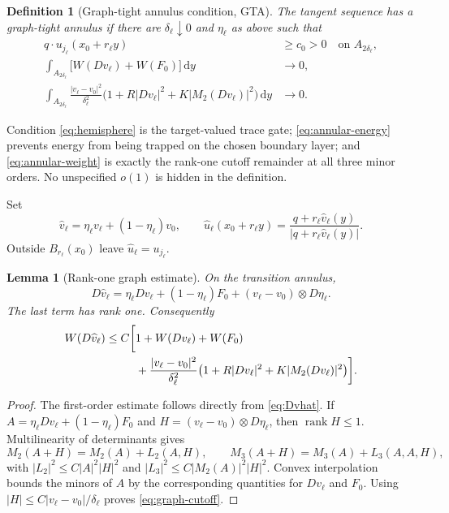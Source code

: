 \documentclass[10pt]{article}
\newtheorem{lemma}[theorem]{Lemma}
\newtheorem{definition}[theorem]{Definition}
\newcommand{\dd}{\,\mathrm d}
\begin{document}
\begin{definition}[Graph-tight annulus condition, GTA]
The tangent sequence has a graph-tight annulus if there are
$\delta_\ell\downarrow0$ and $\eta_\ell$ as above such that
\begin{align}
 q\cdot u_{j_\ell}(x_0+r_\ell y)&\geq c_0>0
 \quad\text{on }A_{2\delta_\ell},                        \label{eq:hemisphere}\\
 \int_{A_{2\delta_\ell}}\!\!
 \bigl[W(Dv_\ell)+W(F_0)\bigr]\dd y&\longrightarrow0,    \label{eq:annular-energy}\\
 \int_{A_{2\delta_\ell}}\!\!
 \frac{|v_\ell-v_0|^2}{\delta_\ell^2}
 \bigl(1+R|Dv_\ell|^2+K|M_2(Dv_\ell)|^2\bigr)\dd y
 &\longrightarrow0.                                    \label{eq:annular-weight}
\end{align}
\end{definition}

Condition \eqref{eq:hemisphere} is the target-valued trace gate;
\eqref{eq:annular-energy} prevents energy from being trapped on the chosen
boundary layer; and \eqref{eq:annular-weight} is exactly the rank-one cutoff
remainder at all three minor orders.  No unspecified $o(1)$ is hidden in the
definition.

Set
\begin{equation}
 \widehat v_\ell
 =\eta_\ell v_\ell+(1-\eta_\ell)v_0,\qquad
 \widehat u_\ell(x_0+r_\ell y)
 =\frac{q+r_\ell\widehat v_\ell(y)}
 {|q+r_\ell\widehat v_\ell(y)|}.                        \label{eq:uhat}
\end{equation}
Outside $B_{r_\ell}(x_0)$ leave $\widehat u_\ell=u_{j_\ell}$.

\begin{lemma}[Rank-one graph estimate]
On the transition annulus,
\begin{equation}
 D\widehat v_\ell
 =\eta_\ell Dv_\ell+(1-\eta_\ell)F_0
 +(v_\ell-v_0)\otimes D\eta_\ell.                       \label{eq:Dvhat}
\end{equation}
The last term has rank one.  Consequently
\begin{align}
 W(D\widehat v_\ell)
 \leq C\bigg[&
 1+W(Dv_\ell)+W(F_0)\notag\\
 &+\frac{|v_\ell-v_0|^2}{\delta_\ell^2}
 \bigl(1+R|Dv_\ell|^2+K|M_2(Dv_\ell)|^2\bigr)\bigg].
 \label{eq:graph-cutoff}
\end{align}
\end{lemma}

\begin{proof}
The first-order estimate follows directly from \eqref{eq:Dvhat}.  If
$A=\eta_\ell Dv_\ell+(1-\eta_\ell)F_0$ and
$H=(v_\ell-v_0)\otimes D\eta_\ell$, then $\operatorname{rank}H\leq1$.
Multilinearity of determinants gives
\[
 M_2(A+H)=M_2(A)+L_2(A,H),\qquad
 M_3(A+H)=M_3(A)+L_3(A,A,H),
\]
with
$|L_2|^2\leq C|A|^2|H|^2$ and
$|L_3|^2\leq C|M_2(A)|^2|H|^2$.
Convex interpolation bounds the minors of $A$ by the corresponding
quantities for $Dv_\ell$ and $F_0$.  Using
$|H|\leq C|v_\ell-v_0|/\delta_\ell$ proves
\eqref{eq:graph-cutoff}.
\end{proof}
\end{document}
